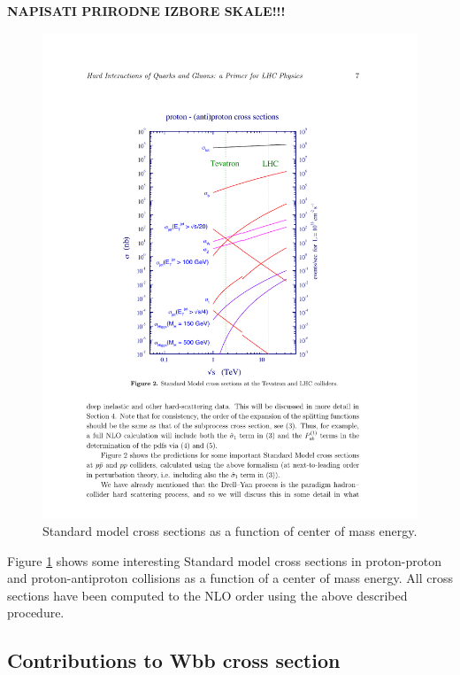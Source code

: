 \textbf{NAPISATI PRIRODNE IZBORE SKALE!!!}  

\begin{figure}[htbp]
	\centering
		\includegraphics{Figures/pp_xsec.pdf}
	\caption[Proton-proton cross sections]{Standard model cross sections as a function of center of mass energy.\cite{Campbell:2006wx} }
	\label{fig:pp_xsec}
\end{figure}
\par Figure \ref{fig:pp_xsec} shows some interesting Standard model cross sections in proton-proton and proton-antiproton collisions as a function of a center of mass energy. All cross sections have been computed to the NLO order using the above described procedure.

 

\subsection{Contributions to Wbb cross section}


